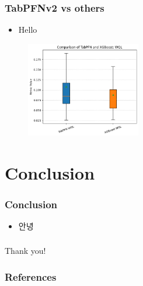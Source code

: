 \documentclass[compress]{beamer}
\begin{document}
\begin{frame}\frametitle{TabPFNv2 vs others}
	\begin{itemize}
		\item Hello
	\end{itemize}
	\begin{figure}
		\includegraphics[width = 5cm]{images/fig_ts_wql.png}
	\end{figure}
\end{frame}

\section{Conclusion}
\begin{frame}\frametitle{Conclusion}
	\begin{itemize}
		\item 안녕
	\end{itemize}
\end{frame}

\begin{frame}\frametitle{}
    \vfill
    \begin{center}
        \begin{Huge}Thank you!\end{Huge}
    \end{center}
    \vfill
\end{frame}

\begin{frame}[t, allowframebreaks]\frametitle{References}
    \nocite{*} %
    
\end{frame}
\end{document}

